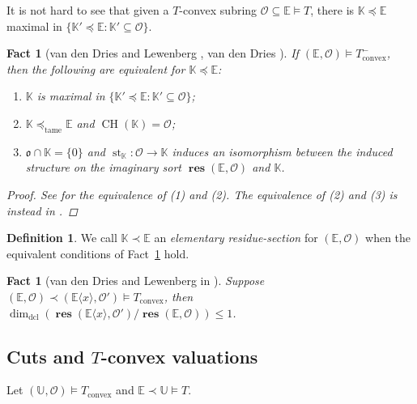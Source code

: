\documentclass{amsart}
\newtheorem{fact}[theorem]{Fact}
\theoremstyle{remark}
\theoremstyle{definition}
\newtheorem{definition}[theorem]{Definition}
\theoremstyle{plain}
\newcommand{\bE}{\mathbb E}
\newcommand{\bK}{\mathbb K}
\newcommand{\bU}{\mathbb U}
\newcommand{\cO}{\mathcal O}
\newcommand{\co}{\mathfrak o}
\newcommand{\convex}{\mathrm{convex}}
\newcommand{\tame}{\mathrm{tame}}
\DeclareMathOperator{\res}{\mathbf{res}}
\DeclareMathOperator{\std}{\mathrm{st}}
\DeclareMathOperator{\dcl}{\mathrm{dcl}}
\DeclareMathOperator{\CH}{\mathrm{CH}}
\theoremstyle{plain}
\begin{document}
It is not hard to see that given a $T$-convex subring $\cO \subseteq \bE\models T$, there is $\bK \preceq \bE$ maximal in $\{\bK' \preceq \bE: \bK' \subseteq \cO\}$. 

\begin{fact}[{van den Dries and Lewenberg {\cite[2.12]{dries1995t}}, van den Dries {\cite[Thm.~A]{dries1997t}}\nocite{dries1998corrections}}]\label{fact:res_iso_max}
	If $(\bE, \cO) \models T_\convex^-$, then the following are equivalent for $\bK \preceq \bE$:
    \begin{enumerate}
        \item $\bK$ is maximal in $\{\bK' \preceq \bE: \bK' \subseteq \cO\}$;
        \item $\bK\preceq_\tame \bE$ and $\CH(\bK)=\cO$;
        \item $\co \cap \bK = \{0\}$ and $\std_\bK: \cO \to \bK$ induces an isomorphism between the induced structure on the imaginary sort $\res(\bE, \cO)$ and $\bK$.
    \end{enumerate}
    \begin{proof}
        See \cite[2.12]{dries1995t} for the equivalence of (1) and (2). The equivalence of (2) and (3) is instead in \cite[1.13]{dries1997t}.
    \end{proof}
\end{fact}

\begin{definition}
    We call $\bK \prec \bE$ an \emph{elementary residue-section} for $(\bE, \cO)$ when the equivalent conditions of Fact~\ref{fact:res_iso_max} hold.
\end{definition}

\begin{fact}[{van den Dries and Lewenberg in \cite[5.3]{dries1995t}}]\label{fact:res_dim_inequality}
    Suppose $(\bE,\cO)\prec (\bE \langle x \rangle, \cO')\models T_\convex$, then $\dim_{\dcl}(\res(\bE\langle x \rangle, \cO')/\res(\bE, \cO))\le 1$.
\end{fact}

\subsection{Cuts and \texorpdfstring{$T$}{T}-convex valuations}

Let $(\bU, \cO)\models T_\convex$ and $\bE \prec \bU \models T$.
\end{document}
